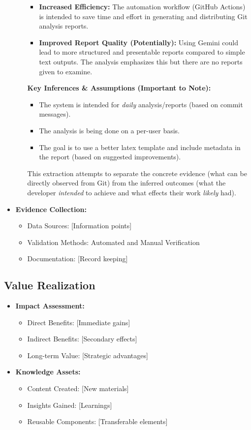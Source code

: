 \documentclass{article}
\begin{document}
\begin{itemize}
\begin{itemize}
\begin{itemize}
    \item \textbf{Increased Efficiency:} The automation workflow (GitHub Actions) is intended to save time and effort in generating and distributing Git analysis reports.
    \item \textbf{Improved Report Quality (Potentially):}  Using Gemini could lead to more structured and presentable reports compared to simple text outputs. The analysis emphasizes this but there are no reports given to examine.
\end{itemize}
\textbf{Key Inferences \& Assumptions (Important to Note):}
\begin{itemize}
    \item The system is intended for \textit{daily} analysis/reports (based on commit messages).
    \item The analysis is being done on a per-user basis.
    \item The goal is to use a better latex template and include metadata in the report (based on suggested improvements).
\end{itemize}
This extraction attempts to separate the concrete evidence (what can be directly observed from Git) from the inferred outcomes (what the developer \textit{intended} to achieve and what effects their work \textit{likely} had).
    \end{itemize}
    \item \textbf{Evidence Collection:}
    \begin{itemize}
        \item Data Sources: [Information points]
        \item Validation Methods: Automated and Manual Verification
        \item Documentation: [Record keeping]
    \end{itemize}
\end{itemize}
\subsection{Value Realization}
\begin{itemize}
    \item \textbf{Impact Assessment:}
    \begin{itemize}
        \item Direct Benefits: [Immediate gains]
        \item Indirect Benefits: [Secondary effects]
        \item Long-term Value: [Strategic advantages]
    \end{itemize}
    \item \textbf{Knowledge Assets:}
    \begin{itemize}
        \item Content Created: [New materials]
        \item Insights Gained: [Learnings]
        \item Reusable Components: [Transferable elements]
    \end{itemize}
\end{itemize}
\end{document}
